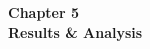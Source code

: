 \begin{center}

    \thispagestyle{empty}
    \vspace*{\fill}
    
    \Huge 
    \textbf{Chapter 5\\ Results \& Analysis }
       

    \vspace*{\fill}
\end{center}